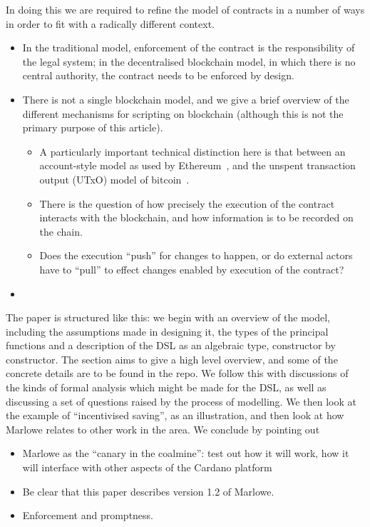 \documentclass[
      acmsmall
    , screen
    , review=true
  ]{acmart}
\begin{document}
In doing this we are required to refine the model of contracts in a number of ways in order to fit with a radically different context. 
\begin{itemize}
\item In the traditional model, enforcement of the contract is the responsibility of the legal system; in the decentralised blockchain model, in which there is no central authority, the contract needs to be enforced by design. 
\item There is not a single blockchain model, and we give a brief overview of the different mechanisms for scripting on blockchain (although this is not the primary purpose of this article). 
\begin{itemize}
\item
A particularly important technical distinction here is that between an account-style model as used by Ethereum~\cite{EthereumRationale}, and the unspent transaction output (UTxO) model of bitcoin~\cite{sok}. 
\item There is the question of how precisely the execution of the contract interacts with the blockchain, and how information is to be recorded on the chain.
\item Does the execution ``push'' for changes  to happen, or do external actors have to ``pull'' to effect changes enabled by execution of the contract?
\end{itemize}
\item {}
\end{itemize}

\noindent
{}
The paper is structured like this: we begin with an overview of the model, including the assumptions made in designing 
it, the types of the principal functions and a description of the DSL as an algebraic type, constructor by constructor. 
The section aims to give a high level overview, and some of the concrete details are to be found in the repo. We follow 
this with discussions of the kinds of formal analysis which might be made for the DSL, as well as discussing a  set of 
questions raised by the process of modelling. We then look at the example of ``incentivised saving'', as an 
illustration, and then look at how Marlowe relates to other work in the area. We conclude by pointing out 

\begin{itemize}
\item
Marlowe as the ``canary in the coalmine'': test out how it will work, how it will interface with
other aspects of the Cardano platform
\item
Be clear that this paper describes version 1.2 of Marlowe.
\item 
Enforcement and promptness.
\end{itemize}
\end{document}
